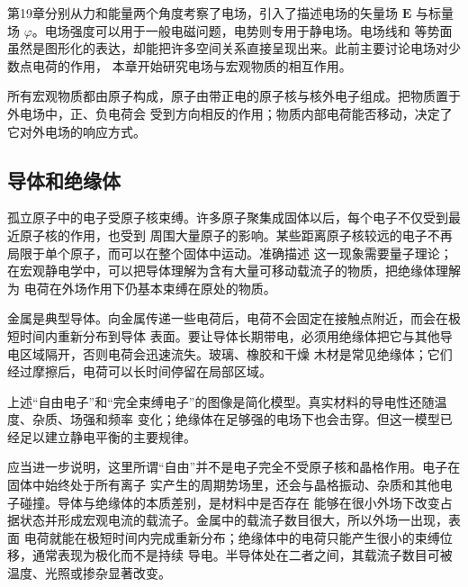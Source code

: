 {%
\newcommand{\emHemisphereQuestion}{%
\begin{center}
\begin{tikzpicture}[x=1cm,y=1cm]
  \draw[xesblue,line width=1.1pt] (-5,0)--(-1.45,0) (1.45,0)--(5,0);
  \draw[xesblue,line width=1.1pt] (-1.45,0) arc[start angle=180,end angle=0,radius=1.45];
  \draw[xesline] (0,0)--(35:1.45) node[midway,below right]{$R$};
  \fill[DeepBlue] (0,3.25) circle (5pt);\node[xeslabel,above=4pt] at (0,3.25) {$+q$};
  \draw[<->,Gold!80,line width=.6pt] (-.42,0)--(-.42,3.25);\node[xestiny,text=Gold!80!black] at (-.68,1.63) {$a$};
\end{tikzpicture}
\end{center}}


第19章分别从力和能量两个角度考察了电场，引入了描述电场的矢量场
$\boldsymbol E$ 与标量场 $\varphi$。电场强度可以用于一般电磁问题，电势则专用于静电场。电场线和
等势面虽然是图形化的表达，却能把许多空间关系直接呈现出来。此前主要讨论电场对少数点电荷的作用，
本章开始研究电场与宏观物质的相互作用。

所有宏观物质都由原子构成，原子由带正电的原子核与核外电子组成。把物质置于外电场中，正、负电荷会
受到方向相反的作用；物质内部电荷能否移动，决定了它对外电场的响应方式。


\subsection{导体和绝缘体}


孤立原子中的电子受原子核束缚。许多原子聚集成固体以后，每个电子不仅受到最近原子核的作用，也受到
周围大量原子的影响。某些距离原子核较远的电子不再局限于单个原子，而可以在整个固体中运动。准确描述
这一现象需要量子理论；在宏观静电学中，可以把导体理解为含有大量可移动载流子的物质，把绝缘体理解为
电荷在外场作用下仍基本束缚在原处的物质。

金属是典型导体。向金属传递一些电荷后，电荷不会固定在接触点附近，而会在极短时间内重新分布到导体
表面。要让导体长期带电，必须用绝缘体把它与其他导电区域隔开，否则电荷会迅速流失。玻璃、橡胶和干燥
木材是常见绝缘体；它们经过摩擦后，电荷可以长时间停留在局部区域。

上述“自由电子”和“完全束缚电子”的图像是简化模型。真实材料的导电性还随温度、杂质、场强和频率
变化；绝缘体在足够强的电场下也会击穿。但这一模型已经足以建立静电平衡的主要规律。

应当进一步说明，这里所谓“自由”并不是电子完全不受原子核和晶格作用。电子在固体中始终处于所有离子
实产生的周期势场里，还会与晶格振动、杂质和其他电子碰撞。导体与绝缘体的本质差别，是材料中是否存在
能够在很小外场下改变占据状态并形成宏观电流的载流子。金属中的载流子数目很大，所以外场一出现，表面
电荷就能在极短时间内完成重新分布；绝缘体中的电荷只能产生很小的束缚位移，通常表现为极化而不是持续
导电。半导体处在二者之间，其载流子数目可被温度、光照或掺杂显著改变。

}
